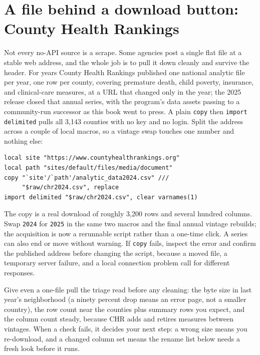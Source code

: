 \section{A file behind a download button: County Health Rankings}\label{sec:chr}
Not every no-API source is a scrape. Some agencies post a single flat file at a stable web address, and the whole job is to pull it down cleanly and survive the header. For years County Health Rankings published one national analytic file per year, one row per county, covering premature death, child poverty, insurance, and clinical-care measures, at a URL that changed only in the year; the 2025 release closed that annual series, with the program's data assets passing to a community-run successor as this book went to press. A plain \texttt{copy} then \texttt{import delimited} pulls all 3{,}143 counties with no key and no login. Split the address across a couple of local macros, so a vintage swap touches one number and nothing else:
\par
{\footnotesize
\begin{verbatim}
local site "https://www.countyhealthrankings.org"
local path "sites/default/files/media/document"
copy "`site'/`path'/analytic_data2024.csv" ///
     "$raw/chr2024.csv", replace
import delimited "$raw/chr2024.csv", clear varnames(1)
\end{verbatim}
}
The copy is a real download of roughly 3{,}200 rows and several hundred columns. Swap \texttt{2024} for \texttt{2025} in the same two macros and the final annual vintage rebuilds; the acquisition is now a rerunnable script rather than a one-time click. A series can also end or move without warning. If \texttt{copy} fails, inspect the error and confirm the published address before changing the script, because a moved file, a temporary server failure, and a local connection problem call for different responses.

Give even a one-file pull the triage read before any cleaning: the byte size in last year's neighborhood (a ninety percent drop means an error page, not a smaller country), the row count near the counties plus summary rows you expect, and the column count steady, because CHR adds and retires measures between vintages. When a check fails, it decides your next step: a wrong size means you re-download, and a changed column set means the rename list below needs a fresh look before it runs.

